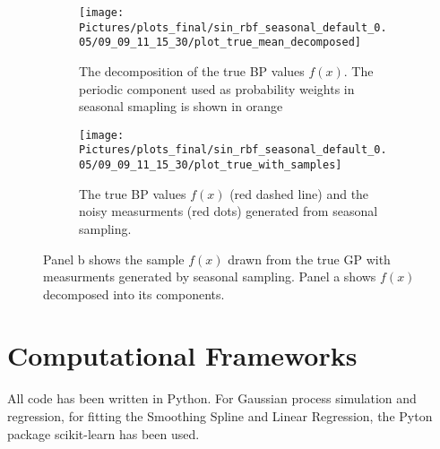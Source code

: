 \begin{figure}[!ht]
\centering
\begin{subfigure}{.45\textwidth}
    \centering
    \texttt{[image: 
        Pictures/plots\_final/sin\_rbf\_seasonal\_default\_0.05/09\_09\_11\_15\_30/plot\_true\_mean\_decomposed]}
    \caption{The decomposition of the true BP values $f(x)$. The periodic component used
    as probability weights in seasonal smapling is shown in orange}
\end{subfigure}\hfill
\begin{subfigure}{.45\textwidth}
    \centering
    \texttt{[image: 
        Pictures/plots\_final/sin\_rbf\_seasonal\_default\_0.05/09\_09\_11\_15\_30/plot\_true\_with\_samples]}
    \caption{The true BP values $f(x)$ (red dashed line) and the noisy measurments (red dots) generated
    from seasonal sampling. \\
    }
\end{subfigure}
\caption{Panel b shows the sample $f(x)$ drawn from the true GP with measurments generated
by seasonal sampling. Panel a shows $f(x)$ decomposed into its components.}
\label{fig:seasonal-sampling}
\end{figure}



\section{Computational Frameworks}

All code has been written in Python.
For Gaussian process simulation and regression, for fitting the Smoothing Spline
and Linear Regression, the Pyton package scikit-learn
has been used.














